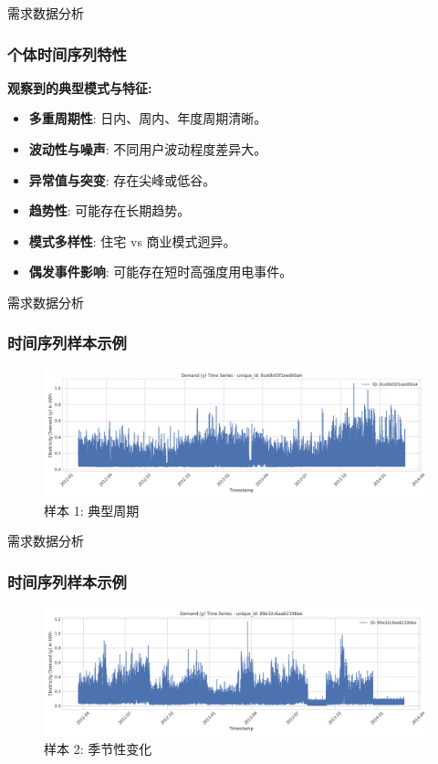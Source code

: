\documentclass{beamer} %
\begin{document}
\begin{frame}{需求数据分析}
    \frametitle{个体时间序列特性}
    \textbf{观察到的典型模式与特征:}
    \begin{itemize}
        \item \textbf{多重周期性}: 日内、周内、年度周期清晰。
        \item \textbf{波动性与噪声}: 不同用户波动程度差异大。
        \item \textbf{异常值与突变}: 存在尖峰或低谷。
        \item \textbf{趋势性}: 可能存在长期趋势。
        \item \textbf{模式多样性}: 住宅 vs 商业模式迥异。
        \item \textbf{偶发事件影响}: 可能存在短时高强度用电事件。
    \end{itemize}
\end{frame}

\begin{frame}{需求数据分析}
    \frametitle{时间序列样本示例}
    \begin{figure}
        \centering
        \includegraphics[width=\textwidth]{../plots/timeseries_sample_8ce0b05f1eed00a4.png}
        \caption{样本 1: 典型周期}
    \end{figure}
\end{frame}

\begin{frame}{需求数据分析}
    \frametitle{时间序列样本示例}
    \begin{figure}
        \centering
        \includegraphics[width=\textwidth]{../plots/timeseries_sample_89e32c6aa6219bbe.png}
        \caption{样本 2: 季节性变化}
    \end{figure}
\end{frame}
\end{document}
